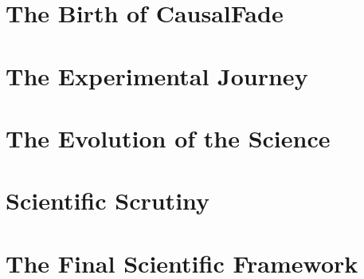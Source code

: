 \documentclass[11pt,oneside,openany]{book}
\theoremstyle{cfmathstyle}
\theoremstyle{cfboxstyle}
\theoremstyle{cfauditstyle}
\DeclareRobustCommand{\_}{\textunderscore\allowbreak}
\begin{document}
\frontmatter


\tableofcontents
\clearpage
\listoffigures
\clearpage
\listoftables
\clearpage

\mainmatter

\part{The Birth of CausalFade}




\part{The Experimental Journey}










\part{The Evolution of the Science}


\part{Scientific Scrutiny}


\part{The Final Scientific Framework}


\end{document}
